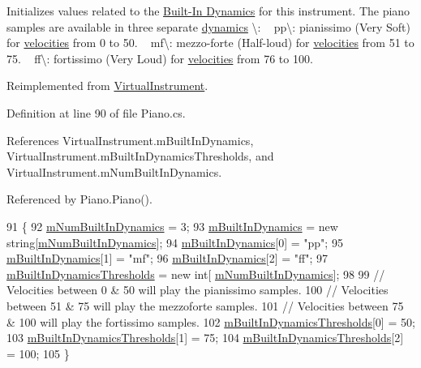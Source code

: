 Initializes values related to the \hyperlink{group___audio_DefBID}{Built-\/\+In Dynamics} for this instrument. The piano samples are available in three separate \hyperlink{group___audio_DefBID}{dynamics} \textbackslash{}\+: ~\newline
 pp\textbackslash{}\+: pianissimo (Very Soft) for \hyperlink{group___audio_DefVel}{velocities} from 0 to 50. ~\newline
 mf\textbackslash{}\+: mezzo-\/forte (Half-\/loud) for \hyperlink{group___audio_DefVel}{velocities} from 51 to 75. ~\newline
 ff\textbackslash{}\+: fortissimo (Very Loud) for \hyperlink{group___audio_DefVel}{velocities} from 76 to 100. 



Reimplemented from \hyperlink{group___v_i_base_virt_func_ga995456c03ee54543b285188c51c29a07}{Virtual\+Instrument}.



Definition at line 90 of file Piano.\+cs.



References Virtual\+Instrument.\+m\+Built\+In\+Dynamics, Virtual\+Instrument.\+m\+Built\+In\+Dynamics\+Thresholds, and Virtual\+Instrument.\+m\+Num\+Built\+In\+Dynamics.



Referenced by Piano.\+Piano().


\begin{DoxyCode}
91     \{
92         \hyperlink{group___v_i_base_pro_var_gac265f64f759d267ee1e1680f8d387011}{mNumBuiltInDynamics} = 3;
93         \hyperlink{group___v_i_base_pro_var_ga87961e72f25fbc2256b614a394aa6f13}{mBuiltInDynamics} = \textcolor{keyword}{new} \textcolor{keywordtype}{string}[\hyperlink{group___v_i_base_pro_var_gac265f64f759d267ee1e1680f8d387011}{mNumBuiltInDynamics}];
94         \hyperlink{group___v_i_base_pro_var_ga87961e72f25fbc2256b614a394aa6f13}{mBuiltInDynamics}[0] = \textcolor{stringliteral}{"pp"};
95         \hyperlink{group___v_i_base_pro_var_ga87961e72f25fbc2256b614a394aa6f13}{mBuiltInDynamics}[1] = \textcolor{stringliteral}{"mf"};
96         \hyperlink{group___v_i_base_pro_var_ga87961e72f25fbc2256b614a394aa6f13}{mBuiltInDynamics}[2] = \textcolor{stringliteral}{"ff"};
97         \hyperlink{group___v_i_base_pro_var_gae3db4264dc2a96e99ea680c6d637e6bf}{mBuiltInDynamicsThresholds} = \textcolor{keyword}{new} \textcolor{keywordtype}{int}[
      \hyperlink{group___v_i_base_pro_var_gac265f64f759d267ee1e1680f8d387011}{mNumBuiltInDynamics}];
98 
99         \textcolor{comment}{// Velocities between 0 & 50 will play the pianissimo samples.}
100         \textcolor{comment}{// Velocities between 51 & 75 will play the mezzoforte samples.}
101         \textcolor{comment}{// Velocities between 75 & 100 will play the fortissimo samples.  }
102         \hyperlink{group___v_i_base_pro_var_gae3db4264dc2a96e99ea680c6d637e6bf}{mBuiltInDynamicsThresholds}[0] = 50;
103         \hyperlink{group___v_i_base_pro_var_gae3db4264dc2a96e99ea680c6d637e6bf}{mBuiltInDynamicsThresholds}[1] = 75;
104         \hyperlink{group___v_i_base_pro_var_gae3db4264dc2a96e99ea680c6d637e6bf}{mBuiltInDynamicsThresholds}[2] = 100;
105     \}
\end{DoxyCode}
